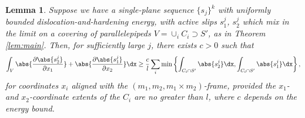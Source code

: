 \documentclass[11pt,reqno]{amsart}
\theoremstyle{plain}
\newtheorem{lemma}[theorem]{Lemma}
\theoremstyle{definition}
\theoremstyle{remark}
\begin{document}
\begin{lemma}\label{lem:int_min}
Suppose we have a single-plane sequence $\{s_j\}^k$ with uniformly bounded dislocation-and-hardening energy, with active slips $s_1^j$, $s_2^j$ which mix in the limit on a covering of parallelepipeds $V = \cup_i C_i\supset S'$, as in Theorem \ref{lem:main}. Then, for sufficiently large $j$, there exists $c>0$ such that
\begin{equation}\label{eq:L1_est}
\int_V \abs{\frac{\partial \abs{s_{2}^j}}{\partial x_1}}  +  \abs{\frac{\partial \abs{s_{1}^j}}{\partial x_2}}\dx\ge\frac{c}{l}\sum_i \min \left\{\int_{C_i\cap S'}\abs{s_2^j}\dx, \int_{C_i\cap S'}\abs{s_1^j}\dx\right\},
\end{equation}
for coordinates $x_i$ aligned with the $(m_1,m_2,m_1\times m_2)$-frame, provided the $x_1$- and $x_2$-coordinate extents of the $C_i$ are no greater than $l$, where $c$ depends on the energy bound.
\end{lemma}
\end{document}
